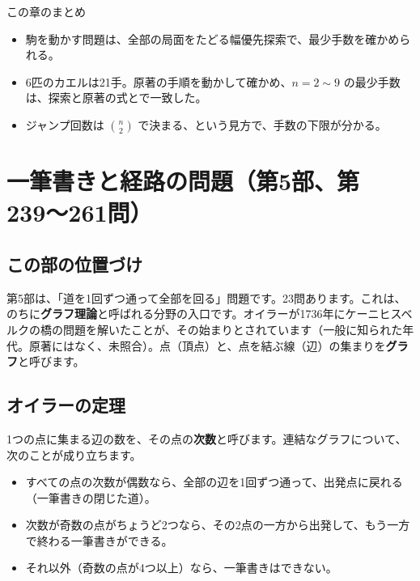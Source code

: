 \documentclass[a4paper,11pt,openany]{ltjsbook}
\begin{document}
\begin{pointbox}{この章のまとめ}
\begin{itemize}[leftmargin=*]
\item 駒を動かす問題は、全部の局面をたどる幅優先探索で、最少手数を確かめられる。
\item 6匹のカエルは21手。原著の手順を動かして確かめ、$n=2\sim9$ の最少手数は、探索と原著の式とで一致した。
\item ジャンプ回数は $\binom{n}{2}$ で決まる、という見方で、手数の下限が分かる。
\end{itemize}
\end{pointbox}

\chapter{一筆書きと経路の問題（第5部、第239〜261問）}

\section{この部の位置づけ}

第5部は、「道を1回ずつ通って全部を回る」問題です。23問あります。これは、のちに\textbf{グラフ理論}と呼ばれる分野の入口です。オイラーが1736年にケーニヒスベルクの橋の問題を解いたことが、その始まりとされています（一般に知られた年代。原著にはなく、未照合）。点（頂点）と、点を結ぶ線（辺）の集まりを\textbf{グラフ}と呼びます。

\section{オイラーの定理}

1つの点に集まる辺の数を、その点の\textbf{次数}と呼びます。連結なグラフについて、次のことが成り立ちます。

\begin{itemize}[leftmargin=*]
\item すべての点の次数が偶数なら、全部の辺を1回ずつ通って、出発点に戻れる（一筆書きの閉じた道）。
\item 次数が奇数の点がちょうど2つなら、その2点の一方から出発して、もう一方で終わる一筆書きができる。
\item それ以外（奇数の点が4つ以上）なら、一筆書きはできない。
\end{itemize}
\end{document}
